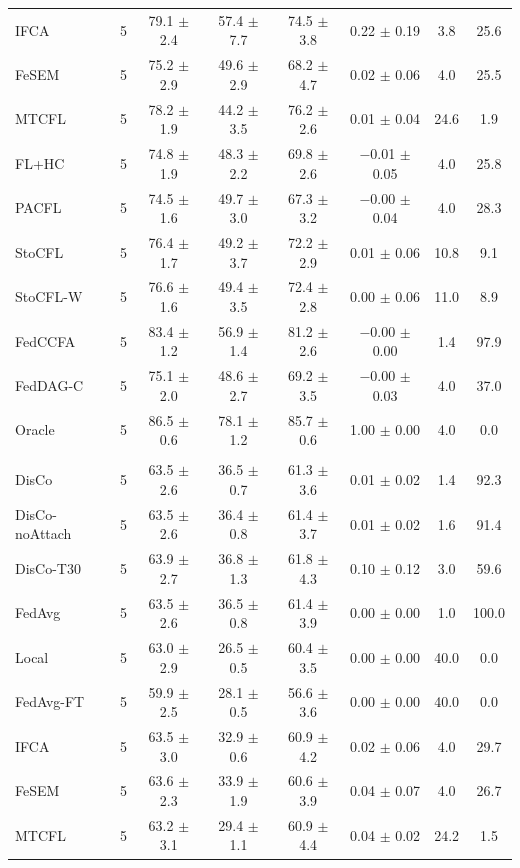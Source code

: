 {\begin{tabular}{l r c c c c c c}
IFCA & 5 & 79.1 $\pm$ 2.4 & 57.4 $\pm$ 7.7 & 74.5 $\pm$ 3.8 & 0.22 $\pm$ 0.19 & 3.8 & 25.6 \\
FeSEM & 5 & 75.2 $\pm$ 2.9 & 49.6 $\pm$ 2.9 & 68.2 $\pm$ 4.7 & 0.02 $\pm$ 0.06 & 4.0 & 25.5 \\
MTCFL & 5 & 78.2 $\pm$ 1.9 & 44.2 $\pm$ 3.5 & 76.2 $\pm$ 2.6 & 0.01 $\pm$ 0.04 & 24.6 & 1.9 \\
FL+HC & 5 & 74.8 $\pm$ 1.9 & 48.3 $\pm$ 2.2 & 69.8 $\pm$ 2.6 & $-$0.01 $\pm$ 0.05 & 4.0 & 25.8 \\
PACFL & 5 & 74.5 $\pm$ 1.6 & 49.7 $\pm$ 3.0 & 67.3 $\pm$ 3.2 & $-$0.00 $\pm$ 0.04 & 4.0 & 28.3 \\
StoCFL & 5 & 76.4 $\pm$ 1.7 & 49.2 $\pm$ 3.7 & 72.2 $\pm$ 2.9 & 0.01 $\pm$ 0.06 & 10.8 & 9.1 \\
StoCFL-W & 5 & 76.6 $\pm$ 1.6 & 49.4 $\pm$ 3.5 & 72.4 $\pm$ 2.8 & 0.00 $\pm$ 0.06 & 11.0 & 8.9 \\
FedCCFA & 5 & 83.4 $\pm$ 1.2 & 56.9 $\pm$ 1.4 & 81.2 $\pm$ 2.6 & $-$0.00 $\pm$ 0.00 & 1.4 & 97.9 \\
FedDAG-C & 5 & 75.1 $\pm$ 2.0 & 48.6 $\pm$ 2.7 & 69.2 $\pm$ 3.5 & $-$0.00 $\pm$ 0.03 & 4.0 & 37.0 \\
Oracle & 5 & 86.5 $\pm$ 0.6 & 78.1 $\pm$ 1.2 & 85.7 $\pm$ 0.6 & 1.00 $\pm$ 0.00 & 4.0 & 0.0 \\
\addlinespace
\multicolumn{8}{l}{\textit{CIFAR-10 rotation}} \\
DisCo & 5 & 63.5 $\pm$ 2.6 & 36.5 $\pm$ 0.7 & 61.3 $\pm$ 3.6 & 0.01 $\pm$ 0.02 & 1.4 & 92.3 \\
DisCo-noAttach & 5 & 63.5 $\pm$ 2.6 & 36.4 $\pm$ 0.8 & 61.4 $\pm$ 3.7 & 0.01 $\pm$ 0.02 & 1.6 & 91.4 \\
DisCo-T30 & 5 & 63.9 $\pm$ 2.7 & 36.8 $\pm$ 1.3 & 61.8 $\pm$ 4.3 & 0.10 $\pm$ 0.12 & 3.0 & 59.6 \\
FedAvg & 5 & 63.5 $\pm$ 2.6 & 36.5 $\pm$ 0.8 & 61.4 $\pm$ 3.9 & 0.00 $\pm$ 0.00 & 1.0 & 100.0 \\
Local & 5 & 63.0 $\pm$ 2.9 & 26.5 $\pm$ 0.5 & 60.4 $\pm$ 3.5 & 0.00 $\pm$ 0.00 & 40.0 & 0.0 \\
FedAvg-FT & 5 & 59.9 $\pm$ 2.5 & 28.1 $\pm$ 0.5 & 56.6 $\pm$ 3.6 & 0.00 $\pm$ 0.00 & 40.0 & 0.0 \\
IFCA & 5 & 63.5 $\pm$ 3.0 & 32.9 $\pm$ 0.6 & 60.9 $\pm$ 4.2 & 0.02 $\pm$ 0.06 & 4.0 & 29.7 \\
FeSEM & 5 & 63.6 $\pm$ 2.3 & 33.9 $\pm$ 1.9 & 60.6 $\pm$ 3.9 & 0.04 $\pm$ 0.07 & 4.0 & 26.7 \\
MTCFL & 5 & 63.2 $\pm$ 3.1 & 29.4 $\pm$ 1.1 & 60.9 $\pm$ 4.4 & 0.04 $\pm$ 0.02 & 24.2 & 1.5 \\

\end{tabular}}
